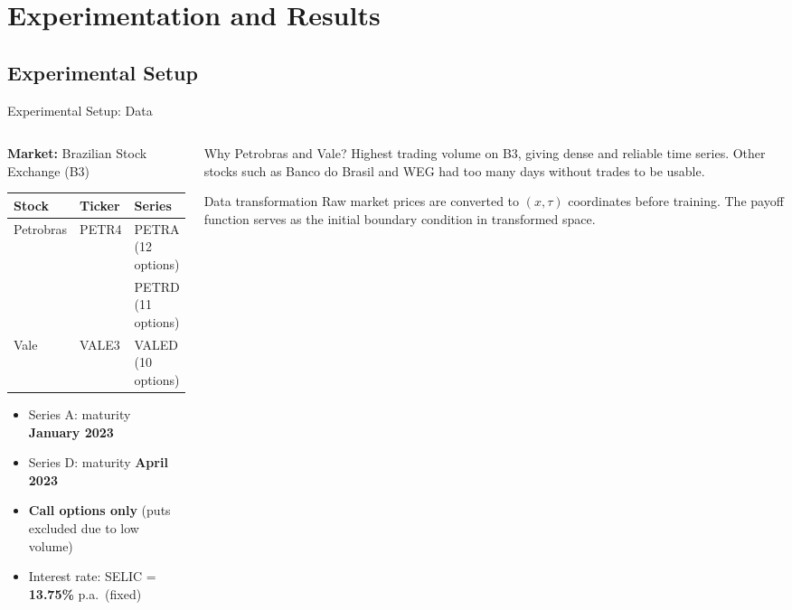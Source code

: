 \section{Experimentation and Results}
\subsection{Experimental Setup}
\begin{frame}{Experimental Setup: Data}

  \begin{columns}[T]
    \begin{column}{0.50\textwidth}
      \textbf{Market:} Brazilian Stock Exchange (B3) \cite{santos2024}

      \vspace{0.5em}
      \begin{tabular}{lll}
        \toprule
        \textbf{Stock} & \textbf{Ticker} & \textbf{Series} \\
        \midrule
        Petrobras & PETR4 & PETRA (12 options) \\
                  &       & PETRD (11 options) \\
        Vale      & VALE3 & VALED (10 options) \\
        \bottomrule
      \end{tabular}

      \vspace{0.6em}
      \begin{itemize}
        \item Series A: maturity \textbf{January 2023}
        \item Series D: maturity \textbf{April 2023}
        \item \textbf{Call options only} (puts excluded due to low volume)
        \item Interest rate: SELIC = \textbf{13.75\%} p.a.\ (fixed)
      \end{itemize}
    \end{column}
    \begin{column}{0.46\textwidth}
      \begin{block}{Why Petrobras and Vale?}
        Highest trading volume on B3, giving dense and reliable time series. Other stocks such as Banco do Brasil and WEG had too many days without trades to be usable.
      \end{block}
      \vspace{0.5em}
      \begin{block}{Data transformation}
        Raw market prices are converted to $(x, \tau)$ coordinates before training. The payoff function serves as the initial boundary condition in transformed space.
      \end{block}
    \end{column}
  \end{columns}

\end{frame}

